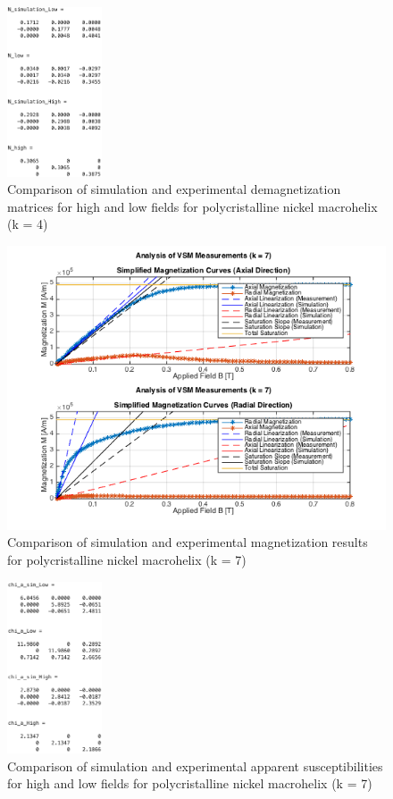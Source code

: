 \begin{figure}[h]
	\centering
  \includegraphics[width=0.25\textwidth]{Pictures/ExperimentalAssessk4N.png}
	\caption{Comparison of simulation and experimental demagnetization matrices for high and low fields for polycristalline nickel macrohelix (k = 4)}
	\label{fig:ExperimentalAssessk4N}
\end{figure}

\begin{figure}[h]
	\centering
  \includegraphics[width=1\textwidth]{Pictures/ExperimentalAssessk7.png}
	\caption{Comparison of simulation and experimental magnetization results for polycristalline nickel macrohelix (k = 7)}
	\label{fig:ExperimentalAssessk7}
\end{figure}

\begin{figure}[h]
	\centering
  \includegraphics[width=0.25\textwidth]{Pictures/ExperimentalAssessk7chi.png}
	\caption{Comparison of simulation and experimental apparent susceptibilities for high and low fields for polycristalline nickel macrohelix (k = 7)}
	\label{fig:ExperimentalAssessk7chi}
\end{figure}


